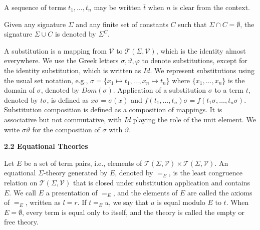 \documentclass[10pt,a4paper]{amsart}
\begin{document}
 
 
A sequence of terms $t_{1},\dots,t_{n}$ may be written $\bar{t}$ when $n$ is clear from the context.\par
 
 
 
Given any signature $\Sigma$ and any finite set of constants $C$ such that $\Sigma\cap C=\emptyset$, the signature $\Sigma\cup C$ is denoted by ${\Sigma}^{C}$.\par
 
 
 
A substitution is a mapping from $\mathcal{V}$ to $\mathcal{T}(\Sigma,\mathcal{V})$, which is the identity almost everywhere. We use the Greek letters $\sigma,\vartheta,\varphi$ to denote substitutions, except for the identity substitution, which is written as $\mathit{Id}$. We represent substitutions using the usual set notation, e.g., $\sigma=\{x_{1}\mapsto t_{1},\dots,x_{n}\mapsto t_{n}\}$ where $\{x_{1},\dots,x_{n}\}$ is the domain of $\sigma$, denoted by $\mathit{Dom}(\sigma)$. Application of a substitution $\sigma$ to a term $t$, denoted by $t\sigma$, is defined as $x\sigma=\sigma(x)$ and $f(t_{1},\ldots,t_{n})\sigma=f(t_{1}\sigma,\ldots,t_{n}\sigma)$. Substitution composition is defined as a composition of mappings. It is associative but not commutative, with $\mathit{Id}$ playing the role of the unit element. We write $\sigma\vartheta$ for the composition of $\sigma$ with $\vartheta$.\par
 
 
 
 
\par\medskip\noindent\textbf{2.2 Equational Theories}\par
 
 
Let $E$ be a set of term pairs, i.e., elements of $\mathcal{T}(\Sigma,\mathcal{V})\times\mathcal{T}(\Sigma,\mathcal{V})$. An equational $\Sigma$-theory generated by $E$, denoted by $=_{E}$, is the least congruence relation on $\mathcal{T}(\Sigma,\mathcal{V})$ that is closed under substitution application and contains $E$. We call $E$ a presentation of $=_{E}$, and the elements of $E$ are called the axioms of $=_{E}$, written as $l=r$. If $t=_{E}u$, we say that $u$ is equal modulo $E$ to $t$. When $E=\emptyset$, every term is equal only to itself, and the theory is called the empty or free theory.\par
 
\end{document}
